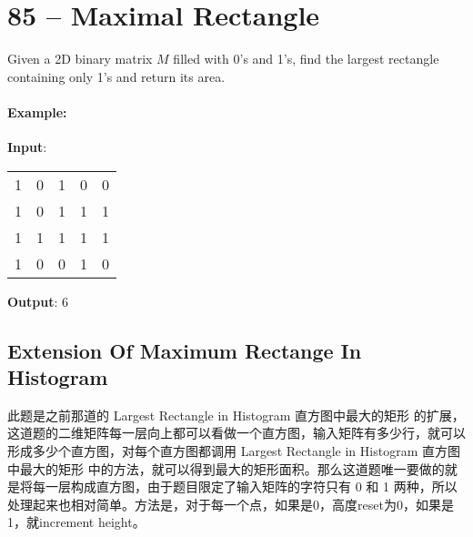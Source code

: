\section{85 -- Maximal Rectangle}
Given a 2D binary matrix $M$ filled with 0's and 1's, find the largest rectangle containing only 1's and return its area.
\paragraph{Example:}
\begin{flushleft}
\textbf{Input}:
\begin{table}[H]
\begin{tabular}{lllll}
1 & 0 & 1 & 0 & 0 \\
1 & 0 & {\color{red}1} & {\color{red}1} & {\color{red}1} \\
1 & 1 & {\color{red}1} & {\color{red}1} & {\color{red}1} \\
1 & 0 & 0 & 1 & 0
\end{tabular}
\end{table}
\textbf{Output}: 6
\end{flushleft}
\subsection{Extension Of Maximum Rectange In Histogram}
此题是之前那道的 Largest Rectangle in Histogram 直方图中最大的矩形 的扩展，这道题的二维矩阵每一层向上都可以看做一个直方图，输入矩阵有多少行，就可以形成多少个直方图，对每个直方图都调用 Largest Rectangle in Histogram 直方图中最大的矩形 中的方法，就可以得到最大的矩形面积。那么这道题唯一要做的就是将每一层构成直方图，由于题目限定了输入矩阵的字符只有 0 和 1 两种，所以处理起来也相对简单。方法是，对于每一个点，如果是0，高度reset为0，如果是 1，就increment height。
